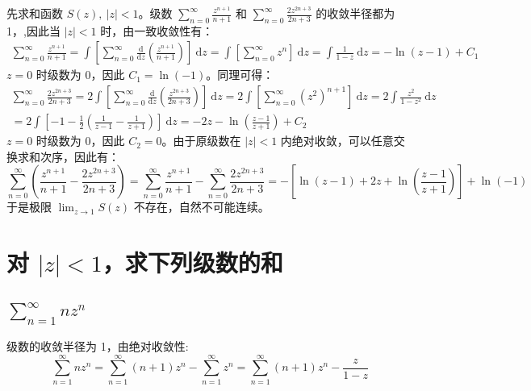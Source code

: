 \documentclass[UTF8]{report}
\theoremstyle{MyLineTheoremStyle} %
\theoremstyle{MyBlockTheoremStyle} %
\theoremstyle{MySubsubsectionStyle} %
\begin{document}
先求和函数 $S(z),\ | z | < 1$。级数 $\sum_{n=0}^{\infty} \frac{z^{n+1}}{n+1}$ 和 $\sum_{n=0}^{\infty} \frac{2z^{2n+3}}{2n+3}$ 的收敛半径都为 1，,因此当 $| z | < 1$ 时，由一致收敛性有：
\begin{gather}
    \sum_{n=0}^{\infty} \frac{z^{n+1}}{n+1} 
    = \int \left[ \sum_{n=0}^{\infty}  \frac{\mathrm{d} }{\mathrm{d} z }  \left(\frac{z^{n+1}}{n+1}\right) \right]\ \mathrm{d}z
    = \int \left[  \sum_{n=0}^{\infty} z^n  \right]\ \mathrm{d}z 
    = \int \frac{1}{1 - z} \ \mathrm{d}z
    = - \ln (z - 1) + C_1
\end{gather}
$z = 0$ 时级数为 0，因此 $C_1 = \ln (-1)$。同理可得：
\begin{gather}
    \sum_{n=0}^{\infty} \frac{2z^{2n+3}}{2n+3}
    = 2 \int \left[ \sum_{n=0}^{\infty}  \frac{\mathrm{d} }{\mathrm{d} z }  \left(\frac{z^{2n+3}}{2n+3}\right) \right]\ \mathrm{d}z
    = 2 \int \left[  \sum_{n=0}^{\infty} \left(z^2\right)^{n+1}  \right]\ \mathrm{d}z 
    = 2 \int \frac{z^2}{1 - z^2} \ \mathrm{d}z \\ 
    = 2 \int \left[ -1 - \frac{1}{2}\left( \frac{1}{z - 1} - \frac{1}{z + 1}\right) \right] \ \mathrm{d}z
    = - 2z - \ln \left(\frac{z - 1}{z + 1}\right)  + C_2
\end{gather}
$z = 0$ 时级数为 0，因此 $C_2 = 0$。由于原级数在 $| z | < 1$ 内绝对收敛，可以任意交换求和次序，因此有：
\begin{equation}
    \sum_{n=0}^{\infty} \left( \frac{z^{n+1}}{n+1} - \frac{2z^{2n+3}}{2n+3} \right) 
    = \sum_{n=0}^{\infty}\frac{z^{n+1}}{n+1} - \sum_{n=0}^{\infty}\frac{2z^{2n+3}}{2n+3}
    =  - \left[ \ln(z - 1) + 2z + \ln \left(\frac{z - 1}{z + 1}\right) \right] + \ln (-1)
\end{equation}
于是极限 $\lim_{z \to 1} S(z)$ 不存在，自然不可能连续。


\section{对 $| z | < 1$，求下列级数的和}



\subsection{$\sum_{n=1}^{\infty} n z^n$}
级数的收敛半径为 1，由绝对收敛性: 
\begin{equation}
    \sum_{n=1}^{\infty} n z^n = \sum_{n=1}^{\infty} (n+1) z^n - \sum_{n=1}^{\infty} z^n = \sum_{n=1}^{\infty} (n+1) z^n - \frac{z}{1 - z}
\end{equation}
\end{document}
